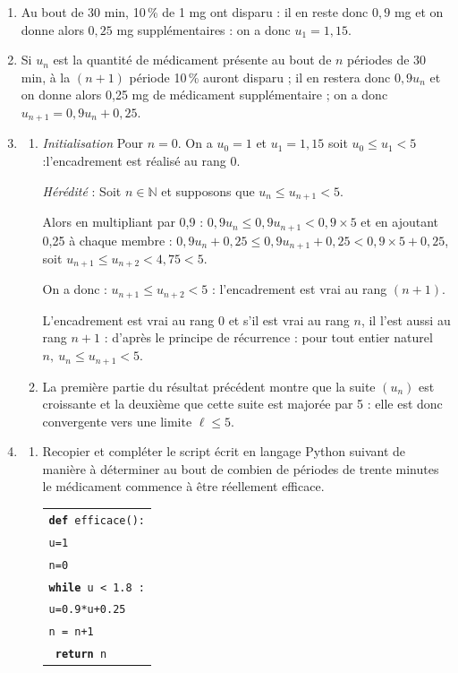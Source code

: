 \documentclass[10pt]{article}
\providecommand{\red}{\color{red}}
\providecommand{\N}{\mathbb{N}}
\providecommand{\red}{\color{red}}
\begin{document}
\begin{enumerate}
\item 
Au bout de 30 min, 10\,\% de 1 mg ont disparu : il en reste donc $0,9$ mg et on donne alors $0,25$ mg supplémentaires : on a donc $u_1 = 1,15$.
\item 

Si $u_n$ est la quantité de médicament présente au bout de $n$ périodes de 30 min, à la $(n + 1)$ période 10\,\% auront disparu ; il en restera donc $0,9u_n$ et on donne alors 0,25 mg de médicament supplémentaire ; on a donc $u_{n+1} = 0,9u_n + 0,25$.
\item 
	\begin{enumerate}
		\item 
		\emph{Initialisation} Pour $n = 0$.
On a $u_0 = 1$ et $u_1 = 1,15$  soit $u_0 \leqslant u_1 < 5$ :l'encadrement est réalisé au rang $0$.

\emph{Hérédité} : Soit $n \in \N$ et supposons que $u_n \leqslant  u_{n+1} < 5$.

Alors en multipliant par 0,9 : $0,9u_n \leqslant 0,9u_{n+1} < 0,9 \times 5$ et en ajoutant 0,25 à chaque membre : $0,9u_n + 0,25 \leqslant 0,9u_{n+1} + 0,25  < 0,9 \times 5 + 0,25$, soit $u_{n+1} \leqslant u_{n+2} < 4,75 < 5$.

On a donc : $u_{n+1} \leqslant u_{n+2} <  5$ : l'encadrement est vrai au rang $(n + 1)$.

L'encadrement est vrai au rang $0$ et s'il est vrai au rang $n$, il l'est aussi au rang $n + 1$ : d'après le principe de récurrence : pour tout entier naturel $n,\: u_n \leqslant  u_{n+1} < 5$.
		\item 
La première partie du résultat précédent montre que la suite $\left(u_n\right)$ est croissante et la deuxième que cette suite est majorée par 5 : elle est donc convergente vers une limite $\ell \leqslant 5$.
	\end{enumerate}
\item 

	\begin{enumerate}
		\item Recopier et compléter le script écrit en langage Python suivant de manière à déterminer au bout de combien de périodes de trente minutes le médicament commence à être réellement efficace.
\begin{center}
\begin{tabular}{|l|}\hline
\texttt{\textbf{def} efficace():}\\
\quad \texttt{u=1}\\
\quad \texttt{n=0}\\
\quad \texttt{\textbf{while} {\red u < 1.8} :}\\
\quad\qquad \texttt{u={\red 0.9*u+0.25}}\\
\quad\qquad \texttt{n = n+1}\\
\quad \texttt{\textbf{ return }n}\\ \hline
\end{tabular}
\end{center}


\end{enumerate}
\end{enumerate}
\end{document}
